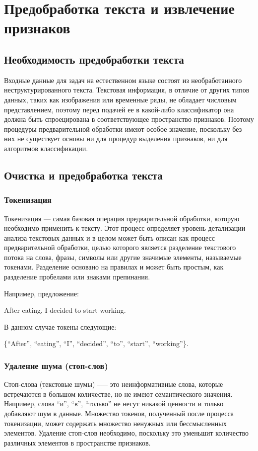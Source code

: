 \section{Предобработка текста и извлечение признаков}

\subsection{Необходимость предобработки текста}

Входные данные для задач на естественном языке состоят из необработанного неструктурированного текста. Текстовая информация, в отличие от других типов данных, таких как изображения или временные ряды, не обладает числовым представлением, поэтому перед подачей ее в какой-либо классификатор она должна быть спроецирована в соответствующее пространство признаков. Поэтому процедуры предварительной обработки имеют особое значение, поскольку без них не существует основы ни для процедур выделения признаков, ни для алгоритмов классификации.

\subsection{Очистка и предобработка текста}
\subsubsection{Токенизация}
Токенизация --- самая базовая операция предварительной обработки, которую необходимо применить к тексту. Этот процесс определяет уровень детализации анализа текстовых данных и в целом может быть описан как процесс предварительной обработки, целью которого является разделение текстового потока на слова, фразы, символы или другие значимые элементы, называемые токенами. Разделение основано на правилах и может быть простым, как разделение пробелами или знаками препинания.

Например, предложение:

After eating, I decided to start working.

В данном случае токены следующие:

\{“After”, “eating”, “I”, “decided”, “to”, “start”, “working”\}.

\subsubsection{Удаление шума (стоп-слов)}
Стоп-слова (текстовые шумы) —-- это неинформативные слова, которые встречаются в большом количестве, но не имеют семантического значения. Например, слова ``и'', ``в'', ``только'' не несут никакой ценности и только добавляют шум в данные. Множество токенов, полученный после процесса токенизации, может содержать множество ненужных или бессмысленных элементов. Удаление стоп-слов необходимо, поскольку это уменьшит количество различных элементов в пространстве признаков. 

